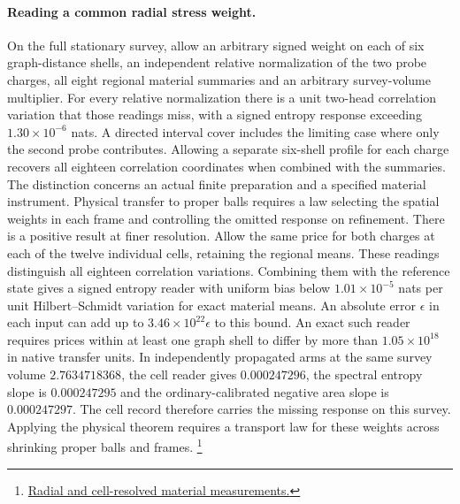 \documentclass[11pt]{article}
\begin{document}
\paragraph{Reading a common radial stress weight.}
On the full stationary survey, allow an arbitrary signed weight on each
of six graph-distance shells, an independent relative normalization of
the two probe charges, all eight regional material summaries and an
arbitrary survey-volume multiplier. For every relative normalization
there is a unit two-head correlation variation that those readings
miss, with a signed entropy response exceeding
$1.30\times10^{-6}$ nats. A directed interval cover includes the
limiting case where only the second probe contributes. Allowing a
separate six-shell profile for each charge recovers all eighteen
correlation coordinates when combined with the summaries. The
distinction concerns an actual finite preparation and a specified
material instrument. Physical transfer to proper balls requires a law
selecting the spatial weights in each frame and controlling the omitted
response on refinement.
There is a positive result at finer resolution. Allow the same price
for both charges at each of the twelve individual cells, retaining
the regional means. These readings distinguish all eighteen correlation
variations. Combining them with the reference state gives a signed
entropy reader with uniform bias below $1.01\times10^{-5}$ nats per
unit Hilbert--Schmidt variation for exact material means. An absolute
error $\epsilon$ in each input can add up to $3.46\times10^{22}\epsilon$
to this bound. An exact such reader requires prices
within at least one graph shell to differ by more than $1.05\times10^{18}$
in native transfer units. In independently propagated arms at the same
survey volume $2.7634718368$, the cell reader gives $0.000247296$, the
spectral entropy slope is $0.000247295$ and the ordinary-calibrated
negative area slope is $0.000247297$.
The cell record therefore carries the missing response on this survey.
Applying the physical theorem requires a transport law for these
weights across shrinking proper balls and frames.
\footnote{\href{https://github.com/FloatingPragma/observer-patch-holography/tree/main/code/matched_einstein_limit/source_implication/full_algebra/correlation_rank/spatial_cuts/radial_profiles}{Radial and cell-resolved material measurements.}}
\end{document}
